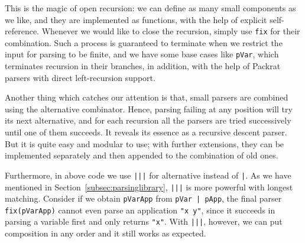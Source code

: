 This is the magic of open recursion: we can define as many small components as we like, and they are implemented as functions, with the help of explicit self-reference. Whenever we would like to close the recursion, simply use \lstinline{fix} for their combination. Such a process is guaranteed to terminate when we restrict the input for parsing to be finite, and we have some base cases like \lstinline{pVar}, which terminates recursion in their branches, in addition, with the help of Packrat parsers with direct left-recursion support.

Another thing which catches our attention is that, small parsers are combined using the alternative combinator. Hence, parsing failing at any position will try its next alternative, and for each recursion all the parsers are tried successively until one of them succeeds. It reveals its essence as a recursive descent parser. But it is quite easy and modular to use; with further extensions, they can be implemented separately and then appended to the combination of old ones.

Furthermore, in above code we use \lstinline{|||} for alternative instead of \lstinline{|}. As we have mentioned in Section~\ref{subsec:parsinglibrary}, \lstinline{|||} is more powerful with longest matching. Consider if we obtain \lstinline{pVarApp} from \lstinline{pVar | pApp}, the final parser \lstinline{fix(pVarApp)} cannot even parse an application \lstinline{"x y"}, since it succeeds in parsing a variable first and only returns \lstinline{"x"}. With \lstinline{|||}, however, we can put composition in any order and it still works as expected.
